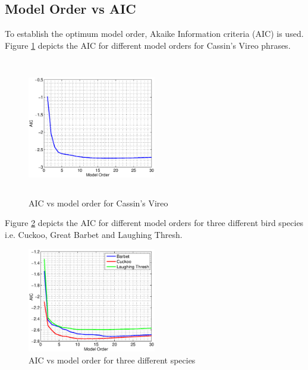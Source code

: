 \documentclass[a4paper]{article}
\begin{document}
 \subsection{Model Order  vs AIC}
 
 
 To establish the optimum model order, Akaike Information criteria (AIC)  \cite{makhoul} is used. Figure \ref{fig:AIC_cassins} depicts the AIC for different model orders for Cassin's Vireo phrases.  
 
 
 \begin{figure}[!ht]
	\centering
	\includegraphics[width=0.5\textwidth,height=6cm] {cassins_AIC.eps}
	\caption{AIC vs model order for Cassin's Vireo }   
	\label{fig:AIC_cassins}
\end{figure} 

 
 
Figure \ref{fig:AIC_3} depicts the AIC for different model orders for three different bird species i.e. Cuckoo, Great Barbet and Laughing Thresh. 

 \begin{figure}[!ht]
	\centering
	\includegraphics[width=0.5\textwidth,height=7 cm] {model_order_vs_AIC.eps}
	\caption{AIC vs model order for three different species }   
	\label{fig:AIC_3}
\end{figure} 
\end{document}
